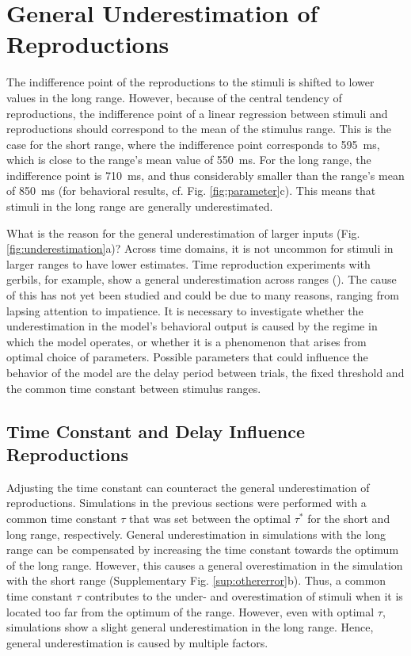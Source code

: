 \documentclass[10pt, a4paper]{article}
\begin{document}
\section{General Underestimation of Reproductions}
The indifference point of the reproductions to the stimuli is shifted to lower values in the long range.
However, because of the central tendency of reproductions, the indifference point of a linear regression between stimuli and reproductions should correspond to the mean of the stimulus range.
This is the case for the short range, where the indifference point corresponds to 595~ms, which is close to the range's mean value of 550~ms. For the long range, the indifference point is 710~ms, and thus considerably smaller than the range's mean of 850~ms (for behavioral results, cf. Fig. \ref{fig:parameter}c). This means that stimuli in the long range are generally underestimated. 

What is the reason for the general underestimation of larger inputs (Fig. \ref{fig:underestimation}a)? 
Across time domains, it is not uncommon for stimuli in larger ranges to have lower estimates. Time reproduction experiments with gerbils, for example, show a general underestimation across ranges (\cite{Henke2022}). 
The cause of this has not yet been studied and could be due to many reasons, ranging from lapsing attention to impatience. 
It is necessary to investigate whether the underestimation in the model's behavioral output is caused by the regime in which the model operates, or whether it is a phenomenon that arises from optimal choice of parameters.
Possible parameters that could influence the behavior of the model are the delay period between trials, the fixed threshold and the common time constant between stimulus ranges.

\subsection{Time Constant and Delay Influence Reproductions}
Adjusting the time constant can counteract the general underestimation of reproductions.
Simulations in the previous sections were performed with a common time constant $\tau$ that was set between the optimal $\tau^*$ for the short and long range, respectively.
General underestimation in simulations with the long range can be compensated by increasing the time constant towards the optimum of the long range. However, this causes a general overestimation in the simulation with the short range (Supplementary Fig. \ref{sup:othererror}b). 
Thus, a common time constant $\tau$ contributes to the under- and overestimation of stimuli when it is located too far from the optimum of the range. However, even with optimal $\tau$, simulations show a slight general underestimation in the long range.
Hence, general underestimation is caused by multiple factors.
\end{document}
